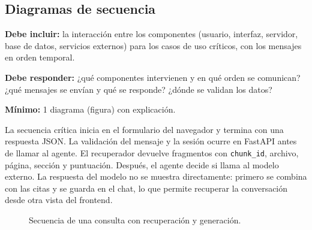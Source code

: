 \subsection{Diagramas de secuencia} \label{sec:diagramas_secuencia} %

\begin{guia}
\textbf{Debe incluir:} la interacción entre los componentes (usuario, interfaz, servidor, base de datos, servicios
externos) para los casos de uso críticos, con los mensajes en orden temporal.

\textbf{Debe responder:} ¿qué componentes intervienen y en qué orden se comunican? ¿qué mensajes se envían y qué se
responde? ¿dónde se validan los datos?

\textbf{Mínimo:} 1 diagrama (figura) con explicación.
\end{guia}

La secuencia crítica inicia en el formulario del navegador y termina con una respuesta JSON. La validación del mensaje y
la sesión ocurre en FastAPI antes de llamar al agente. El recuperador devuelve fragmentos con \texttt{chunk\_id}, archivo,
página, sección y puntuación. Después, el agente decide si llama al modelo externo. La respuesta del modelo no se muestra
directamente: primero se combina con las citas y se guarda en el chat, lo que permite recuperar la conversación desde otra
vista del frontend.

\begin{figure}[H]
\centering
{}
\caption{Secuencia de una consulta con recuperación y generación.}
\label{fig:secuencia_consulta}
\end{figure}

